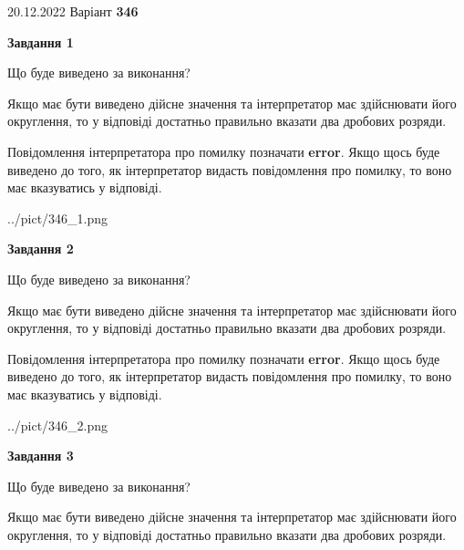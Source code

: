 \documentclass[12pt, ukrainian]{article}
\begin{document}
{20.12.2022 Варіант \No \textbf { 346 }\par}
{
\begin {Large}

{\begin {center}\textbf{Завдання 1}\end {center}}\par
Що буде виведено за виконання? \par

Якщо має бути виведено дійсне значення та інтерпретатор має здійснювати його округлення, 
то у відповіді достатньо правильно вказати два дробових розряди.

Повідомлення інтерпретатора про помилку позначати \textbf{error}.
Якщо щось буде виведено до того, як інтерпретатор видасть повідомлення про помилку, 
то воно має вказуватись у відповіді. \par

\begin{center}
	{../pict/346_1.png}
\end{center}
\newpage

{\begin {center}\textbf{Завдання 2}\end {center}}\par
Що буде виведено за виконання? \par

Якщо має бути виведено дійсне значення та інтерпретатор має здійснювати його округлення, 
то у відповіді достатньо правильно вказати два дробових розряди.

Повідомлення інтерпретатора про помилку позначати \textbf{error}.
Якщо щось буде виведено до того, як інтерпретатор видасть повідомлення про помилку, 
то воно має вказуватись у відповіді. \par

\begin{center}
	{../pict/346_2.png}
\end{center}
\newpage

{\begin {center}\textbf{Завдання 3}\end {center}}\par
Що буде виведено за виконання? \par

Якщо має бути виведено дійсне значення та інтерпретатор має здійснювати його округлення, 
то у відповіді достатньо правильно вказати два дробових розряди.


\end{Large}}
\end{document}
